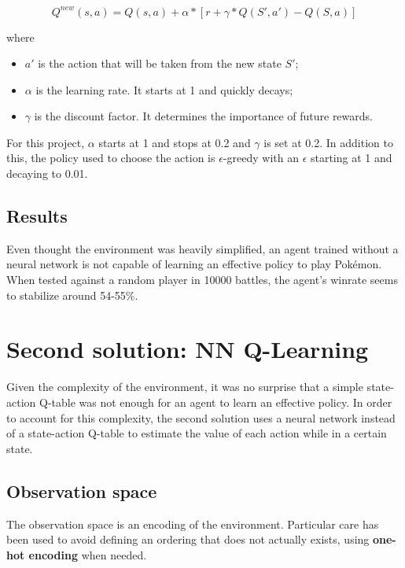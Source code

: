\documentclass{article}
\begin{document}
\begin{equation}
    Q^{new}(s, a) = Q(s, a) + \alpha * [r + \gamma * Q(S', a') - Q(S, a)]
\end{equation}

where
\begin{itemize}
    \item $a'$ is the action that will be taken from the new state $S'$;
    \item $\alpha$ is the learning rate. It starts at 1 and quickly decays;
    \item $\gamma$ is the discount factor. It determines the importance of future rewards.
\end{itemize}
For this project, $\alpha$ starts at 1 and stops at 0.2 and $\gamma$ is set at 0.2.
In addition to this, the policy used to choose the action is $\epsilon$-greedy with an $\epsilon$ starting at 1 and decaying to 0.01.

\subsection{Results}

Even thought the environment was heavily simplified, an agent trained without a neural network is not capable of learning an effective policy to play Pokémon.
When tested against a random player in 10000 battles, the agent's winrate seems to stabilize around 54-55\%.


\section{Second solution: NN Q-Learning} \label{DQN_results}

Given the complexity of the environment, it was no surprise that a simple state-action Q-table was not enough for an agent to learn an effective policy.
In order to account for this complexity, the second solution uses a neural network instead of a state-action Q-table to estimate the value of each action while in a certain state.

\subsection{Observation space}

The observation space is an encoding of the environment.
Particular care has been used to avoid defining an ordering that does not actually exists, using \textbf{one-hot encoding} when needed.
\end{document}
